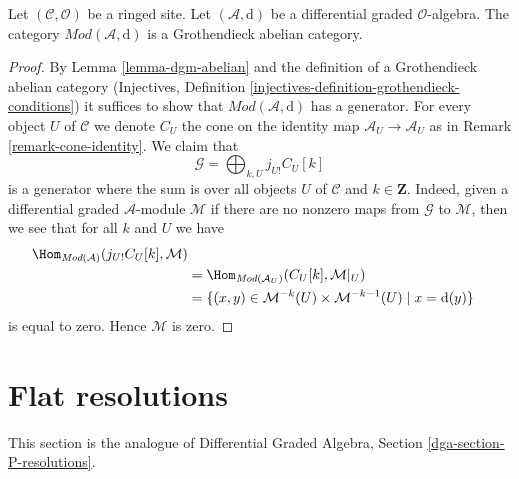 \begin{lemma}
\label{lemma-dgm-grothendieck-abelian}
Let $(\mathcal{C}, \mathcal{O})$ be a ringed site.
Let $(\mathcal{A}, \text{d})$ be a differential graded $\mathcal{O}$-algebra.
The category $\textit{Mod}(\mathcal{A}, \text{d})$
is a Grothendieck abelian category.
\end{lemma}

\begin{proof}
By Lemma \ref{lemma-dgm-abelian} and the definition of a Grothendieck
abelian category
(Injectives, Definition \ref{injectives-definition-grothendieck-conditions})
it suffices to
show that $\textit{Mod}(\mathcal{A}, \text{d})$
has a generator. For every object $U$ of $\mathcal{C}$ we denote
$C_U$ the cone on the identity map $\mathcal{A}_U \to \mathcal{A}_U$
as in Remark \ref{remark-cone-identity}. We claim that
$$
\mathcal{G} = \bigoplus\nolimits_{k, U} j_{U!}C_U[k]
$$
is a generator where the sum is over all objects $U$ of $\mathcal{C}$
and $k \in \mathbf{Z}$. Indeed, given a
differential graded $\mathcal{A}$-module $\mathcal{M}$
if there are no nonzero maps from $\mathcal{G}$ to $\mathcal{M}$,
then we see that for all $k$ and $U$ we have
\begin{align*}
\Hom_{\textit{Mod}(\mathcal{A})}(j_{U!}C_U[k], \mathcal{M}) \\
& =
\Hom_{\textit{Mod}(\mathcal{A}_U)}(C_U[k], \mathcal{M}|_U) \\
& =
\{(x, y) \in \mathcal{M}^{-k}(U) \times \mathcal{M}^{-k - 1}(U) \mid
x = \text{d}(y)\}
\end{align*}
is equal to zero. Hence $\mathcal{M}$ is zero.
\end{proof}











\section{Flat resolutions}
\label{section-P-resolutions}

\noindent
This section is the analogue of
Differential Graded Algebra, Section \ref{dga-section-P-resolutions}.

